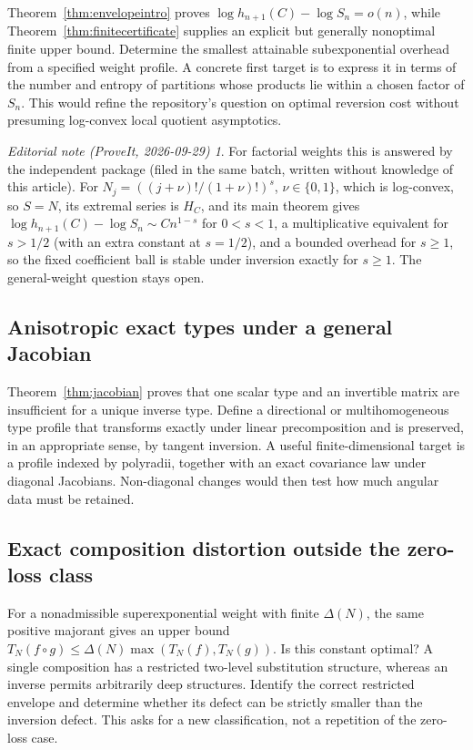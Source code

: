\documentclass[11pt,a4paper]{article}
\numberwithin{equation}{section}
\theoremstyle{definition}
\theoremstyle{remark}
\newtheorem*{ednote}{Editorial note (ProveIt, 2026-09-29)}
\newcommand{\Type}{T_N}
\begin{document}
Theorem~\ref{thm:envelopeintro} proves
$\log h_{n+1}(C)-\log S_n=o(n)$, while
Theorem~\ref{thm:finitecertificate} supplies an explicit but generally
nonoptimal finite upper bound. Determine the smallest attainable
subexponential overhead from a specified weight profile. A concrete first
target is to express it in terms of the number and entropy of partitions
whose products lie within a chosen factor of $S_n$. This would refine
the repository's question on optimal reversion cost without presuming
log-convex local quotient asymptotics.
\begin{ednote}
For factorial weights this is answered by the independent package
 (filed in the same batch,
written without knowledge of this article). For
$N_j=((j+\nu)!/(1+\nu)!)^s$, $\nu\in\{0,1\}$, which is log-convex, so
$S=N$, its extremal series is $H_C$, and its main theorem gives
$\log h_{n+1}(C)-\log S_n\sim Cn^{1-s}$ for $0<s<1$, a multiplicative
equivalent for $s>1/2$ (with an extra constant at $s=1/2$), and a bounded
overhead for $s\ge1$, so the fixed coefficient ball is stable under
inversion exactly for $s\ge1$. The general-weight question stays open.
\end{ednote}

\subsection{Anisotropic exact types under a general Jacobian}

Theorem~\ref{thm:jacobian} proves that one scalar type and an invertible
matrix are insufficient for a unique inverse type. Define a directional
or multihomogeneous type profile that transforms exactly under linear
precomposition and is preserved, in an appropriate sense, by tangent
inversion. A useful finite-dimensional target is a profile indexed by
polyradii, together with an exact covariance law under diagonal
Jacobians. Non-diagonal changes would then test how much angular data
must be retained.

\subsection{Exact composition distortion outside the zero-loss class}

For a nonadmissible superexponential weight with finite $\Delta(N)$, the
same positive majorant gives an upper bound
$\Type(f\circ g)\le\Delta(N)\max(\Type(f),\Type(g))$. Is this
constant optimal? A single composition has a restricted two-level
substitution structure, whereas an inverse permits arbitrarily deep
structures. Identify the correct restricted envelope and determine
whether its defect can be strictly smaller than the inversion defect.
This asks for a new classification, not a repetition of the zero-loss
case.
\end{document}
